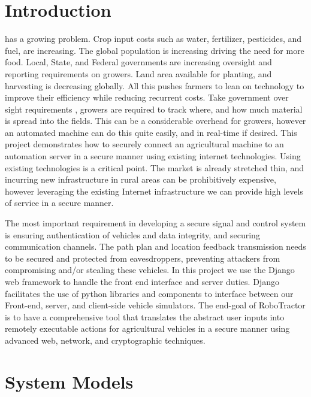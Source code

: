 \documentclass[conference,12pt]{IEEEtran}
\begin{document}
\section{Introduction}
 has a growing problem. Crop input costs such as water,
fertilizer, pesticides, and fuel, are increasing. The global population is
increasing driving the need for more food. Local, State, and Federal governments
are increasing oversight and reporting requirements on growers. Land area
available for planting, and harvesting is decreasing globally. All this pushes
farmers to lean on technology to improve their efficiency while reducing
recurrent costs. Take government over sight requirements
\autocite{_growers_oversight}, growers are required to track where, and how much
material is spread into the fields.  This can be a considerable overhead for
growers, however an automated machine can do this quite easily, and in real-time
if  desired.  This project demonstrates how to securely connect an agricultural
machine to an automation server in a secure manner using existing internet
technologies. Using existing technologies is a critical point. The market is
already stretched thin, and incurring new infrastructure in rural areas can be
prohibitively expensive, however leveraging the existing Internet infrastructure we
can provide high levels of service in a secure manner.

The most important requirement in developing a secure signal and control
system is ensuring authentication of vehicles and data integrity, and securing communication channels.
The path plan and location feedback transmission needs to be secured
and protected from eavesdroppers, preventing attackers from
compromising and/or stealing these vehicles. In this project we use
the Django web framework to handle the front end interface and server duties. 
Django facilitates the use of python libraries and components to interface between our Front-end, server, and client-side vehicle simulators.
The end-goal of RoboTractor is to have a comprehensive tool that
translates the abstract user inputs into remotely executable actions for
agricultural vehicles in a secure manner using advanced web, network, and cryptographic techniques.
\section{System Models}
\end{document}
